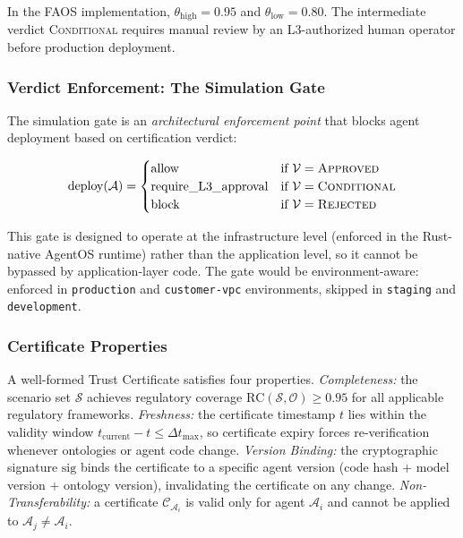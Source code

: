 \documentclass[11pt,a4paper]{article}
\newcommand{\faos}{\textsc{FAOS}}
\newcommand{\agent}{\mathcal{A}}
\newcommand{\scenario}{\mathcal{S}}
\newcommand{\onto}{\mathcal{O}}
\newcommand{\verdict}{\mathcal{V}}
\newcommand{\cert}{\mathcal{C}}
\begin{document}
In the \faos{} implementation, $\theta_{\text{high}} = 0.95$ and
$\theta_{\text{low}} = 0.80$. The intermediate verdict
\textsc{Conditional} requires manual review by an L3-authorized
human operator before production deployment.

\subsubsection{Verdict Enforcement: The Simulation Gate}

The simulation gate is an \emph{architectural enforcement point}
that blocks agent deployment based on certification verdict:

\begin{equation}
  \text{deploy}(\agent) = \begin{cases}
    \text{allow} & \text{if } \verdict = \textsc{Approved} \\
    \text{require\_L3\_approval} & \text{if } \verdict =
      \textsc{Conditional} \\
    \text{block} & \text{if } \verdict = \textsc{Rejected}
  \end{cases}
\end{equation}

This gate is designed to operate at the infrastructure level
(enforced in the Rust-native AgentOS runtime) rather than the
application level, so it cannot be bypassed by application-layer
code.
The gate would be environment-aware: enforced in \texttt{production}
and \texttt{customer-vpc} environments, skipped in \texttt{staging}
and \texttt{development}.

\subsubsection{Certificate Properties}

A well-formed Trust Certificate satisfies four properties.
\emph{Completeness:} the scenario set $\scenario$ achieves regulatory
coverage $\text{RC}(\scenario, \onto) \geq 0.95$ for all applicable
regulatory frameworks. \emph{Freshness:} the certificate timestamp
$t$ lies within the validity window
$t_{\text{current}} - t \leq \Delta t_{\text{max}}$, so certificate
expiry forces re-verification whenever ontologies or agent code
change. \emph{Version Binding:} the cryptographic signature
$\text{sig}$ binds the certificate to a specific agent version
(code hash + model version + ontology version), invalidating the
certificate on any change. \emph{Non-Transferability:} a certificate
$\cert_{\agent_i}$ is valid only for agent $\agent_i$ and cannot be
applied to $\agent_j \neq \agent_i$.
\end{document}
